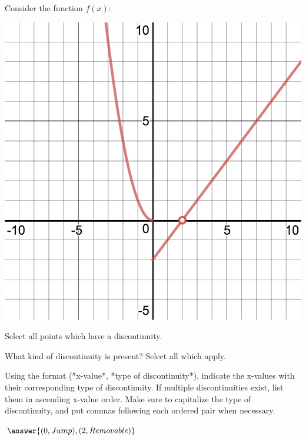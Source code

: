 \documentclass{ximera}
\begin{document}
\begin{question}
Consider the function $f(x)$:
\begin{image}
\includegraphics{continuity5}
\end{image}
Select all points which have a discontinuity.

\begin{selectAll}
\end{selectAll}

What kind of discontinuity is present? Select all which apply.

\begin{selectAll}
\end{selectAll}

Using the format (*x-value*, *type of discontinuity*), indicate the x-values with their corresponding type of discontinuity. If multiple discontinuities exist, list them in ascending x-value order. Make sure to capitalize the type of discontinuity, and put commas following each ordered pair when necessary.

$\answer{(0, Jump), (2, Removable)}$
\end{question}
\end{document}

